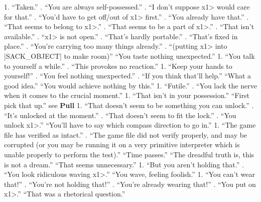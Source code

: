 {{{   1. ``Taken.''
. ``You are always self-possessed.''
. ``I don't suppose \<x1> would care for that.''
. ``You'd have to get off/out of \<x1> first.''
. ``You already have that.''
. ``That seems to belong to \<x1>.''
. ``That seems to be a part of \<x1>.''
. ``That isn't available.''
. ``\<x1> is not open.''
. ``That's hardly portable.''
. ``That's fixed in place.''
. ``You're carrying too many things already.''
. ``(putting \<x1> into |SACK_OBJECT| to make room)''
  ``You taste nothing unexpected.''
   1. ``You talk to yourself a while.''
. ``This provokes no reaction.''
  1. ``Keep your hands to yourself!''
. ``You feel nothing unexpected.''
. ``If you think that'll help.''
  ``What a good idea.''
   ``You would achieve nothing by this.''
 1. ``Futile.''
. ``You lack the nerve when it comes to the crucial moment.''
 1. ``That isn't in your possession.''
\N   ``First pick that up.''
 see {\bf Pull}
  1. ``That doesn't seem to be something you can unlock.''
. ``It's unlocked at the moment.''
. ``That doesn't seem to fit the lock.''
. ``You unlock \<x1>.''
 ``You'll have to say which compass direction to go in.''
  1. ``The game file has verified as intact.''
. ``The game file did not verify properly, and may be corrupted
(or you may be running it on a very primitive interpreter which
is unable properly to perform the test).''
   ``Time passes.''
   ``The dreadful truth is, this is not a dream.''
 ``That seems unnecessary.''
   1. ``But you aren't holding that.''
. ``You look ridiculous waving \<x1>.''
 ``You wave, feeling foolish.''
   1. ``You can't wear that!''
. ``You're not holding that!''
. ``You're already wearing that!''
. ``You put on \<x1>.''
   ``That was a rhetorical question.''
\tenpoint


\newpage
%

}}}
